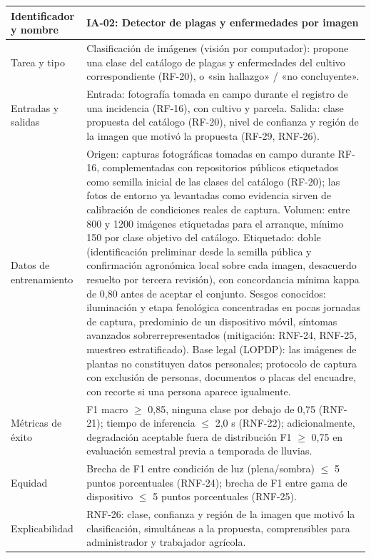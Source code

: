 \documentclass[12pt,a4paper]{article}
\begin{document}
\begin{center}
\begin{longtable}{|p{4.2cm}|p{10cm}|}
\hline
Identificador y nombre & IA-02: Detector de plagas y enfermedades por imagen \\
\hline
Tarea y tipo & Clasificación de imágenes (visión por computador): propone una clase del catálogo de plagas y enfermedades del cultivo correspondiente (RF-20), o «sin hallazgo» / «no concluyente». \\
\hline
Entradas y salidas & Entrada: fotografía tomada en campo durante el registro de una incidencia (RF-16), con cultivo y parcela. Salida: clase propuesta del catálogo (RF-20), nivel de confianza y región de la imagen que motivó la propuesta (RF-29, RNF-26). \\
\hline
Datos de entrenamiento & Origen: capturas fotográficas tomadas en campo durante RF-16, complementadas con repositorios públicos etiquetados como semilla inicial de las clases del catálogo (RF-20); las fotos de entorno ya levantadas como evidencia sirven de calibración de condiciones reales de captura. Volumen: entre 800 y 1200 imágenes etiquetadas para el arranque, mínimo 150 por clase objetivo del catálogo. Etiquetado: doble (identificación preliminar desde la semilla pública y confirmación agronómica local sobre cada imagen, desacuerdo resuelto por tercera revisión), con concordancia mínima kappa de 0,80 antes de aceptar el conjunto. Sesgos conocidos: iluminación y etapa fenológica concentradas en pocas jornadas de captura, predominio de un dispositivo móvil, síntomas avanzados sobrerrepresentados (mitigación: RNF-24, RNF-25, muestreo estratificado). Base legal (LOPDP): las imágenes de plantas no constituyen datos personales; protocolo de captura con exclusión de personas, documentos o placas del encuadre, con recorte si una persona aparece igualmente. \\
\hline
Métricas de éxito & F1 macro $\geq$ 0,85, ninguna clase por debajo de 0,75 (RNF-21); tiempo de inferencia $\leq$ 2,0 s (RNF-22); adicionalmente, degradación aceptable fuera de distribución F1 $\geq$ 0,75 en evaluación semestral previa a temporada de lluvias. \\
\hline
Equidad & Brecha de F1 entre condición de luz (plena/sombra) $\leq$ 5 puntos porcentuales (RNF-24); brecha de F1 entre gama de dispositivo $\leq$ 5 puntos porcentuales (RNF-25). \\
\hline
Explicabilidad & RNF-26: clase, confianza y región de la imagen que motivó la clasificación, simultáneas a la propuesta, comprensibles para administrador y trabajador agrícola. \\

\end{longtable}
\end{center}
\end{document}
